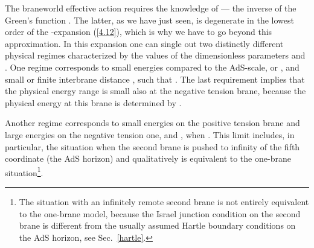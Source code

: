 \documentclass[a4paper,preprint,nofootinbib,
                 showpacs,preprintnumbers,amsmath,amssymb]{revtex4}
\begin{document}
The braneworld effective action requires the knowledge of \coordHE{} --- the inverse of the Green's function \coordHE{}. 
The latter, as we have just seen, is degenerate in the lowest 
order of the \myHighlight{$\Box$}\coordHE{}-expansion (\ref{4.12}), which is why we have to 
go beyond this approximation. In this expansion one can single out 
two distinctly different physical regimes characterized by the 
values of the dimensionless parameters \coordHE{} and \coordHE{}. One 
regime corresponds to small energies compared to the AdS-scale, 
\coordHE{} or \coordHE{}, and small or finite interbrane 
distance \coordHE{}, such that \coordHE{}. The last 
requirement implies that the physical energy range is small also 
at the negative tension brane, because the physical energy at  
this brane is determined by 
\coordHE{}. 
 
Another regime corresponds to small energies on the positive 
tension brane and large energies on the negative tension one, 
\coordHE{} and \coordHE{}, when \coordHE{}. This limit 
includes, in particular, the situation when the second brane is 
pushed to infinity of the fifth coordinate (the AdS horizon) and 
qualitatively is equivalent to the one-brane 
situation\footnote{The situation with an infinitely remote second 
brane is not entirely equivalent to the one-brane model, because 
the Israel junction condition on the second brane is different 
from the usually assumed Hartle boundary conditions on the AdS 
horizon, see Sec.~\ref{hartle}.}. 
 
\end{document}
